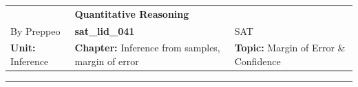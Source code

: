 \documentclass[11pt,paper=a4,answers]{exam}
\begin{document}
\begin{center}
    \centering
    \renewcommand{\arraystretch}{1.5}
    \begin{tabularx}{\textwidth}{YYY}
    & \normalsize\bf{{\Large{{Quantitative Reasoning}}}} & \\
    By Preppeo & \normalsize\bf{{sat\_lid\_041}} & SAT\\
    \normalsize{{\textbf{{Unit:}} Inference}} & \normalsize{{\textbf{{Chapter:}} Inference from samples, margin of error}} & \normalsize{{\textbf{{Topic:}} Margin of Error \& Confidence}} \\
    \end{tabularx}
\end{center}
\par\noindent\rule{\textwidth}{1pt}
\end{document}
